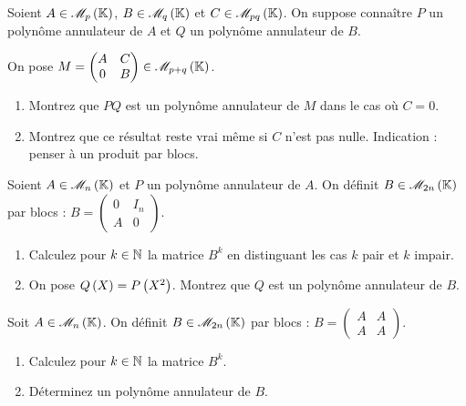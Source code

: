 \begin{exopss}[Exercice 28]
Soient \(A\in\M{p}\), \(B\in\M{q}\) et \(C\in\M{pq}\). On suppose connaître \(P\) un polynôme annulateur de \(A\) et \(Q\) un polynôme annulateur de \(B\).

On pose \(M=\begin{pmatrix}A & C \\ 0 & B\end{pmatrix}\in\M{p+q}\).

\begin{enumerate}
    \item Montrez que \(PQ\) est un polynôme annulateur de \(M\) dans le cas où \(C=0\). \\
    \item Montrez que ce résultat reste vrai même si \(C\) n'est pas nulle. Indication : penser à un produit par blocs.
\end{enumerate}
\end{exopss}

\begin{corr}
\end{corr}

\begin{exopss}[Exercice 29]
Soient \(A\in\M{n}\) et \(P\) un polynôme annulateur de \(A\). On définit \(B\in\M{2n}\) par blocs : \(B=\begin{pmatrix}
0 & I_n \\
A & 0
\end{pmatrix}\).

\begin{enumerate}
    \item Calculez pour \(k\in\mathbb{N}\) la matrice \(B^k\) en distinguant les cas \(k\) pair et \(k\) impair. \\
    \item On pose \(Q\left(X\right)=P\left(X^2\right)\). Montrez que \(Q\) est un polynôme annulateur de \(B\).
\end{enumerate}
\end{exopss}

\begin{corr}
\end{corr}

\begin{exopss}[Exercice 30]
Soit \(A\in\M{n}\). On définit \(B\in\M{2n}\) par blocs : \(B=\begin{pmatrix}
A & A \\
A & A
\end{pmatrix}\).

\begin{enumerate}
    \item Calculez pour \(k\in\mathbb{N}\) la matrice \(B^k\). \\
    \item Déterminez un polynôme annulateur de \(B\).
\end{enumerate}
\end{exopss}

